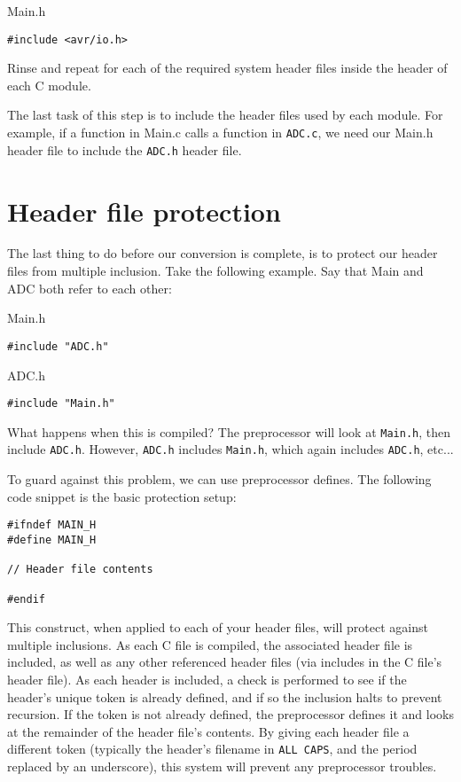 \documentclass[a4paper,oneside]{book}
\begin{document}
Main.h
\begin{center}
\begin{lstlisting}
#include <avr/io.h>
\end{lstlisting}
\end{center}

Rinse and repeat for each of the required system header files inside the header of each C module.

The last task of this step is to include the header files used by each module. For example, if a function in Main.c calls a function in \texttt{ADC.c}, we need our Main.h header file to include the \texttt{ADC.h} header file.

\section{Header file protection}

The last thing to do before our conversion is complete, is to protect our header files from multiple inclusion. Take the following example. Say that Main and ADC both refer to each other:

Main.h
\begin{center}
\begin{lstlisting}
#include "ADC.h"
\end{lstlisting}
\end{center}

ADC.h
\begin{center}
\begin{lstlisting}
#include "Main.h"
\end{lstlisting}
\end{center}

What happens when this is compiled? The preprocessor will look at \texttt{Main.h}, then include \texttt{ADC.h}. However, \texttt{ADC.h} includes \texttt{Main.h}, which again includes \texttt{ADC.h}, etc...

To guard against this problem, we can use preprocessor defines. The following code snippet is the basic protection setup:

\begin{center}
\begin{lstlisting}
#ifndef MAIN_H
#define MAIN_H

// Header file contents

#endif
\end{lstlisting}
\end{center}

This construct, when applied to each of your header files, will protect against multiple inclusions. As each C file is compiled, the associated header file is included, as well as any other referenced header files (via includes in the C file's header file). As each header is included, a check is performed to see if the header's unique token is already defined, and if so the inclusion halts to prevent recursion. If the token is not already defined, the preprocessor defines it and looks at the remainder of the header file's contents. By giving each header file a different token (typically the header's filename in \texttt{ALL CAPS}, and the period replaced by an underscore), this system will prevent any preprocessor troubles.
\end{document}
